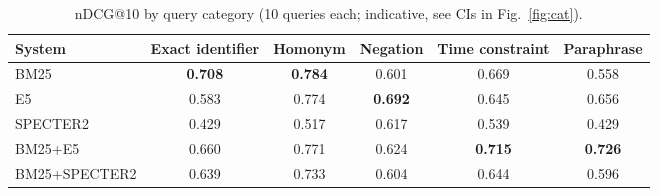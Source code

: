 \begin{table}[t]
\centering
\small
\caption{nDCG@10 by query category (10 queries each; indicative, see CIs in Fig.~\ref{fig:cat}).}
\label{tab:cat}
\begin{tabular}{lccccc}
\toprule
System & Exact identifier & Homonym & Negation & Time constraint & Paraphrase \\
\midrule
BM25 & \textbf{0.708} & \textbf{0.784} & 0.601 & 0.669 & 0.558 \\
E5 & 0.583 & 0.774 & \textbf{0.692} & 0.645 & 0.656 \\
SPECTER2 & 0.429 & 0.517 & 0.617 & 0.539 & 0.429 \\
BM25+E5 & 0.660 & 0.771 & 0.624 & \textbf{0.715} & \textbf{0.726} \\
BM25+SPECTER2 & 0.639 & 0.733 & 0.604 & 0.644 & 0.596 \\
\bottomrule
\end{tabular}
\end{table}
